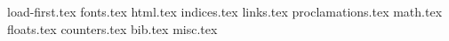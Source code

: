 {load-first.tex}
{fonts.tex}
{html.tex}
{indices.tex}
{links.tex}
{proclamations.tex}
{math.tex}
{floats.tex}
{counters.tex}
{bib.tex}
{misc.tex}
